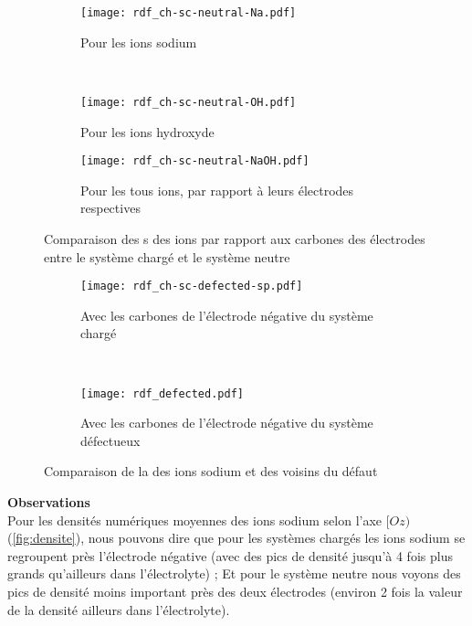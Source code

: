 \begin{figure}[h!]
    \centering
    \begin{subfigure}[t]{.49 \textwidth}
        \centering
        \texttt{[image: rdf\_ch-sc-neutral-Na.pdf]}
        \caption{Pour les ions sodium}
    \end{subfigure}%
    ~
    \begin{subfigure}[t]{.49 \textwidth}
        \centering
        \texttt{[image: rdf\_ch-sc-neutral-OH.pdf]}
        \caption{Pour les ions hydroxyde}
    \end{subfigure}

    \begin{subfigure}[t]{.49 \textwidth}
        \centering
        \texttt{[image: rdf\_ch-sc-neutral-NaOH.pdf]}
        \caption{Pour les tous ions, par rapport à leurs électrodes respectives}
    \end{subfigure}
    \caption{Comparaison des \rdf{}s des ions par rapport aux carbones des électrodes entre le système chargé et le système neutre}
    \label{fig:rdf_ch-sc-neutral}
\end{figure}

\begin{figure}[h!]
    \centering
    \begin{subfigure}[t]{.49 \textwidth}
        \centering
        \texttt{[image: rdf\_ch-sc-defected-sp.pdf]}
        \caption{Avec les carbones de l'électrode négative du système chargé}
    \end{subfigure}%
    ~
    \begin{subfigure}[t]{.49 \textwidth}
        \centering
        \texttt{[image: rdf\_defected.pdf]}
        \caption{Avec les carbones de l'électrode négative du système défectueux}
    \end{subfigure}
    \caption{Comparaison de la \rdf{} des ions sodium et des voisins du défaut}
    \label{fig:rdf_sp}
\end{figure}

\clearpage
\textbf{Observations}\\
Pour les densités numériques moyennes des ions sodium selon l'axe $[Oz)$ (\autoref{fig:densite}), nous pouvons dire que pour les systèmes chargés les ions sodium se regroupent près l'électrode négative (avec des pics de densité jusqu'à \num{4} fois plus grands qu'ailleurs dans l'électrolyte) ; Et pour le système neutre nous voyons des pics de densité moins important près des deux électrodes (environ \num{2} fois la valeur de la densité ailleurs dans l'électrolyte).

